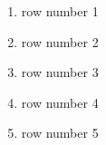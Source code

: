 \documentclass{article}
\begin{document}
	\begin{enumerate}[I]
		\item
			row number 1
		\item
			row number 2
		\item
			row number 3
		\item
			row number 4
		\item
			row number 5
	\end{enumerate}
\end{document}
